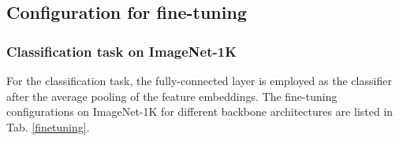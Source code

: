 \documentclass[runningheads]{llncs}
\begin{document}
\subsection{Configuration for fine-tuning}

\subsubsection{Classification task on ImageNet-1K} 

For the classification task, the fully-connected layer is employed as the classifier after the average pooling of the feature embeddings. The fine-tuning configurations on ImageNet-1K for different backbone architectures are listed in Tab. \ref{finetuning}.
\begin{table}[h]
\small
\centering
\caption{Configurations for fine-tuning on ImageNet-1K.}
\label{finetuning}
\end{table}
\end{document}
